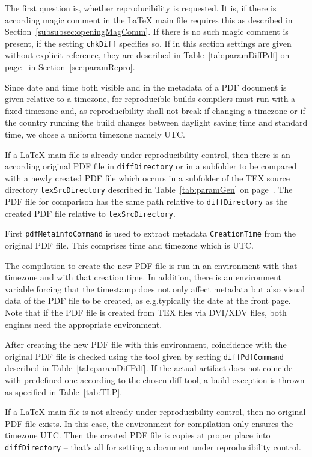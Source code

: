 The first question is, whether reproducibility is requested. 
It is, if there is according magic comment in the \LaTeX{} main file requires this 
as described in Section~\ref{subsubsec:openingMagComm}. 
If there is no such magic comment is present, if the setting \texttt{chkDiff} specifies so. 
If in this section settings are given without explicit reference, 
they are described in Table~\ref{tab:paramDiffPdf} on page~\pageref{tab:paramDiffPdf} 
in Section~\ref{sec:paramRepro}. 

Since date and time both visible and in the metadata of a PDF document 
is given relative to a timezone, 
for reproducible builds compilers must run with a fixed timezone 
and, as reproducibility shall not break if changing a timezone 
or if the country running the build changes between daylight saving time and standard time, 
we chose a uniform timezone namely UTC\@. 

If a \LaTeX{} main file is already under reproducibility control, 
then there is an according original PDF file in \texttt{diffDirectory} or in a subfolder 
to be compared with a newly created PDF file 
which occurs in a subfolder of the TEX source directory \texttt{texSrcDirectory} 
described in Table~\ref{tab:paramGen} on page~\pageref{tab:paramGen}. 
The PDF file for comparison has the same path relative to \texttt{diffDirectory} 
as the created PDF file relative to \texttt{texSrcDirectory}. 

First \texttt{pdfMetainfoCommand} is used 
to extract metadata \texttt{CreationTime} from the original PDF file. 
This comprises time and timezone which is UTC\@. 

The compilation to create the new PDF file is run in an environment 
with that timezone and with that creation time. 
In addition, there is an environment variable forcing 
that the timestamp does not only affect metadata but also visual data of the PDF file 
to be created, 
as e.g.\@ typically the date at the front page. 
Note that if the PDF file is created from TEX files via DVI/XDV files, 
both engines need the appropriate environment. 

After creating the new PDF file with this environment, 
coincidence with the original PDF file is checked 
using the tool given by setting \texttt{diffPdfCommand} described in Table~\ref{tab:paramDiffPdf}. 
If the actual artifact does not coincide with predefined one 
according to the chosen diff tool, 
a build exception is thrown as specified in Table~\ref{tab:TLP}. 
\medskip


If a \LaTeX{} main file is not already under reproducibility control, 
then no original PDF file exists. 
In this case, the environment for compilation only ensures the timezone UTC\@. 
Then the created PDF file is copies at proper place into \texttt{diffDirectory} 
-- that's all for setting a document under reproducibility control. 

